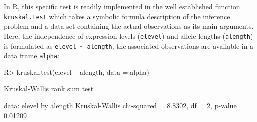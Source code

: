 \documentclass{article}
\newcommand{\Robject}[1]{\texttt{#1}}
\newcommand{\Rcmd}[1]{\texttt{#1}}
\newcommand{\RR}{\textsf{R}}
\newenvironment{Schunk}{}{}
\begin{document}
In \RR{}, this specific test is readily implemented in the well established
function \Rcmd{kruskal.test} which takes a symbolic formula description of the
inference problem and a data set containing the actual observations as its main
arguments. Here, the independence of expression
levels (\Robject{elevel}) and allele lengths (\Robject{alength}) is   
formulated as \verb|elevel ~ alength|, the associated observations are available
in a data frame \Rcmd{alpha}:
\begin{Schunk}
\begin{Sinput}
R> kruskal.test(elevel ~ alength, data = alpha)
\end{Sinput}
\begin{Soutput}
	Kruskal-Wallis rank sum test

data:  elevel by alength 
Kruskal-Wallis chi-squared = 8.8302, df =
2, p-value = 0.01209
\end{Soutput}
\end{Schunk}
\end{document}
